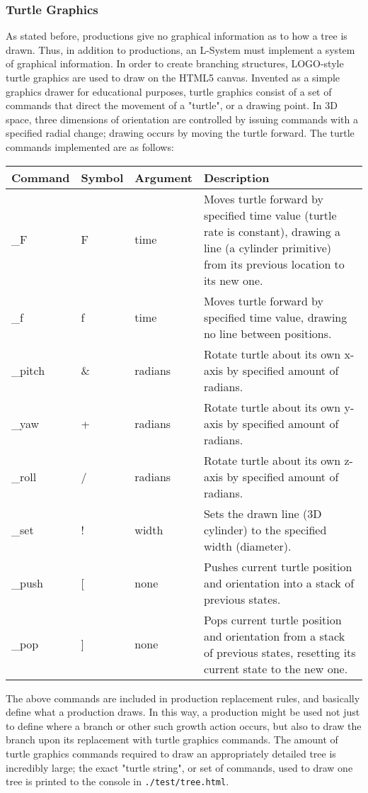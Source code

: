 \documentclass{article}
\newcommand{\tab}{\hspace*{2em}}
\begin{document}
            \subsubsection{Turtle Graphics}
    \tab As stated before, productions give no graphical information as to how a tree is drawn.
Thus, in addition to productions, an L-System must implement a system of graphical information. In
order to create branching structures, LOGO-style turtle graphics are used to draw on the HTML5
canvas. Invented as a simple graphics drawer for educational purposes, turtle graphics consist of a
set of commands that direct the movement of a "turtle", or a drawing point. In 3D space, three
dimensions of orientation are controlled by issuing commands with a specified radial change;
drawing occurs by moving the turtle forward. The turtle commands implemented are as follows:

\begin{center}
\begin{tabular}{|l|l|l|p{7cm}|}
    \hline
    Command & Symbol & Argument & Description \\ \hline \hline
    \_F & F & time & Moves turtle forward by specified time value (turtle rate is constant),
        drawing a line (a cylinder primitive) from its previous location to its new one. \\\hline
    \_f & f & time & Moves turtle forward by specified time value, drawing no line between
        positions. \\\hline
    \_pitch & \& & radians & Rotate turtle about its own x-axis by specified amount of
        radians. \\\hline
    \_yaw & + & radians & Rotate turtle about its own y-axis by specified amount of
        radians. \\\hline
    \_roll & / & radians & Rotate turtle about its own z-axis by specified amount of
        radians. \\\hline
    \_set & ! & width & Sets the drawn line (3D cylinder) to the specified width
        (diameter). \\\hline
    \_push & [ & none & Pushes current turtle position and orientation into a stack of previous
        states. \\\hline
    \_pop & ] & none & Pops current turtle position and orientation from a stack of previous
        states, resetting its current state to the new one. \\\hline

\end{tabular}
\end{center}
    \tab The above commands are included in production replacement rules, and basically define what
a production draws. In this way, a production might be used not just to define where a branch or
other such growth action occurs, but also to draw the branch upon its replacement with turtle
graphics commands. The amount of turtle graphics commands required to draw an appropriately
detailed tree is incredibly large; the exact "turtle string", or set of commands, used to draw one
tree is printed to the console in \verb|./test/tree.html|.
\end{document}
